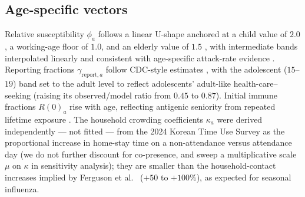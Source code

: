 \documentclass[12pt]{article}
\theoremstyle{plain}
\theoremstyle{remark}
\theoremstyle{definition}
\begin{document}
\subsection{Age-specific vectors}
Relative susceptibility $\phi_a$ follows a linear U-shape anchored at a child value of $2.0$ \cite{Cauchemez2009,Layan2024}, a working-age floor of $1.0$, and an elderly value of $1.5$ \cite{Panatto2018}, with intermediate bands interpolated linearly and consistent with age-specific attack-rate evidence \cite{Jayasundara2014}. Reporting fractions $\gamma_{\mathrm{report},a}$ follow CDC-style estimates \cite{Reed2015}, with the adolescent ($15$--$19$) band set to the adult level to reflect adolescents' adult-like health-care--seeking (raising its observed/model ratio from $0.45$ to $0.87$). Initial immune fractions $R(0)_a$ rise with age, reflecting antigenic seniority from repeated lifetime exposure \cite{Sicca2022,Hancock2009,Dudareva2011}. The household crowding coefficients $\kappa_a$ were derived independently --- not fitted --- from the 2024 Korean Time Use Survey \cite{StatKorea2024} as the proportional increase in home-stay time on a non-attendance versus attendance day (we do not further discount for co-presence, and sweep a multiplicative scale $\mu$ on $\kappa$ in sensitivity analysis); they are smaller than the household-contact increases implied by Ferguson et al.\ \cite{Ferguson2006} ($+50$ to $+100\%$), as expected for seasonal influenza.
\end{document}
